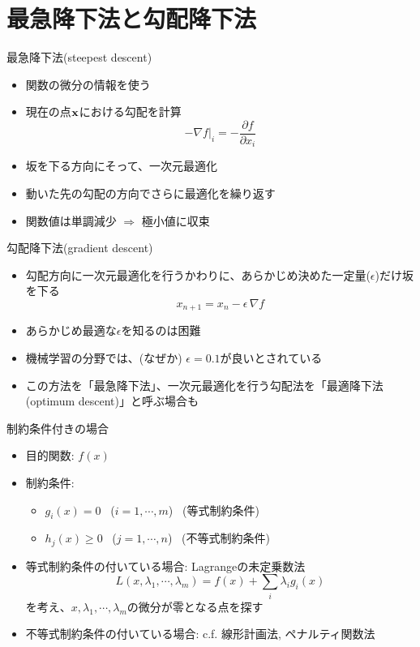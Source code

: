 \section{最急降下法と勾配降下法}

\begin{frame}[t,fragile]{最急降下法(steepest descent)}
  \begin{itemize}
    \setlength{\itemsep}{1em}
  \item 関数の微分の情報を使う
  \item 現在の点$\bf x$における勾配を計算
    \[
    -\nabla f|_i = -\frac{\partial f}{\partial x_i}
    \]
  \item 坂を下る方向にそって、一次元最適化
  \item 動いた先の勾配の方向でさらに最適化を繰り返す
  \item 関数値は単調減少 $\Rightarrow$ 極小値に収束
  \end{itemize}
\end{frame}

\begin{frame}[t,fragile]{勾配降下法(gradient descent)}
  \begin{itemize}
    \setlength{\itemsep}{1em}
  \item 勾配方向に一次元最適化を行うかわりに、あらかじめ決めた一定量($\epsilon$)だけ坂を下る
    \[
    x_{n+1} = x_n - \epsilon \, \nabla f
    \]
  \item あらかじめ最適な$\epsilon$を知るのは困難
  \item 機械学習の分野では、(なぜか) $\epsilon=0.1$が良いとされている
  \item この方法を「最急降下法」、一次元最適化を行う勾配法を「最適降下法(optimum descent)」と呼ぶ場合も
  \end{itemize}
\end{frame}

\begin{frame}[t,fragile]{制約条件付きの場合}
  \begin{itemize}
  \item 目的関数: $f(x)$
  \item 制約条件:
    \begin{itemize}
    \item $g_i(x) = 0$ \ ($i=1,\cdots,m$) \ (等式制約条件)
    \item $h_j(x) \ge 0$ \ ($j=1,\cdots,n$) \ (不等式制約条件)
    \end{itemize}
  \item 等式制約条件の付いている場合: Lagrangeの未定乗数法
    \[
    L(x,\lambda_1,\cdots,\lambda_m)=f(x)+\sum_i \lambda_i g_i(x)
    \]
    を考え、$x,\lambda_1,\cdots,\lambda_m$の微分が零となる点を探す
  \item 不等式制約条件の付いている場合: c.f. 線形計画法, ペナルティ関数法
  \end{itemize}
\end{frame}

